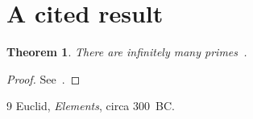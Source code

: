 \documentclass{article}
\newtheorem{theorem}{Theorem}[section]
\begin{document}
\section{A cited result}

\begin{theorem}
\label{thm:euclid}
There are infinitely many primes~\cite{euclid}.
\end{theorem}

\begin{proof}
See~\cite{euclid}.
\end{proof}

\begin{thebibliography}{9}
 Euclid, \textit{Elements}, circa 300~BC.
\end{thebibliography}
\end{document}
